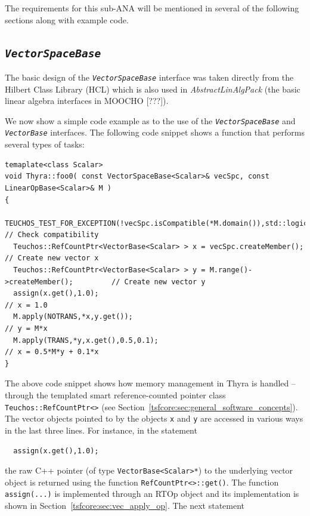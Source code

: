 \documentclass[pdf,ps2pdf,11pt]{SANDreport}
\begin{document}
The requirements for this sub-ANA will be mentioned in several of the
following sections along with example code.

%
\subsection{\texttt{\textit{Vector\-Space\-Base}}}
\label{tsfcore:sec:vec_space}
%

The basic design of the {}\texttt{\textit{Vector\-Space\-Base}} interface was
taken directly from the Hilbert Class Library (HCL) {}\cite{ref:hcl}
which is also used in {}\textit{AbstractLinAlgPack} (the basic linear
algebra interfaces in MOOCHO [???]).

We now show a simple code example as to the use of the
{}\texttt{\textit{Vector\-Space\-Base}} and {}\texttt{\textit{Vector\-Base}}
interfaces.  The following code snippet shows a function that performs
several types of tasks:

{\scriptsize\begin{verbatim}
temaplate<class Scalar>
void Thyra::foo0( const VectorSpaceBase<Scalar>& vecSpc, const LinearOpBase<Scalar>& M )
{
  TEUCHOS_TEST_FOR_EXCEPTION(!vecSpc.isCompatible(*M.domain()),std::logic_error,"Error!"); // Check compatibility
  Teuchos::RefCountPtr<VectorBase<Scalar> > x = vecSpc.createMember();             // Create new vector x
  Teuchos::RefCountPtr<VectorBase<Scalar> > y = M.range()->createMember();         // Create new vector y
  assign(x.get(),1.0);                                                             // x = 1.0
  M.apply(NOTRANS,*x,y.get());                                                     // y = M*x
  M.apply(TRANS,*y,x.get(),0.5,0.1);                                               // x = 0.5*M*y + 0.1*x
}
\end{verbatim}}

{}\noindent{}The above code snippet shows how memory management in Thyra is
handled -- through the templated smart reference-counted pointer class
{}\texttt{Teuchos\-::RefCountPtr<>} (see
Section~\ref{tsfcore:sec:general_software_concepts}).  The vector objects
pointed to by the objects {}\texttt{x} and {}\texttt{y} are accessed in
various ways in the last three lines.  For instance, in the statement

{\scriptsize\begin{verbatim}
  assign(x.get(),1.0);
\end{verbatim}}

{}\noindent{}the raw C++ pointer (of type {}\texttt{VectorBase<Scalar>*}) to the
underlying vector object is returned using the function
{}\texttt{RefCountPtr<>\-::get()}.  The function {}\texttt{assign(...)} is
implemented through an RTOp object and its implementation is shown in
Section~\ref{tsfcore:sec:vec_apply_op}.  The next statement
\end{document}
